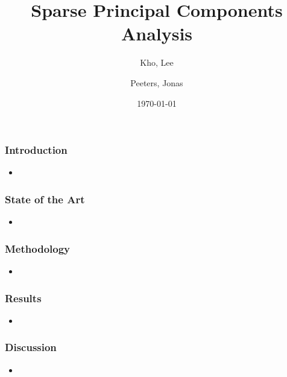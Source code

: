 \documentclass[11pt]{beamer}
\author{
	Kho, Lee
	\and
	Peeters, Jonas
}
\title{Sparse Principal Components Analysis}
\institute{\texttt{[image: ../Figures/nyu\_long\_black.png]}}
\date{\today}
\begin{document}
\begin{frame}
\titlepage
\end{frame}

\begin{frame}\frametitle{Introduction}
\begin{itemize}
\item 
\end{itemize}
\end{frame}

\begin{frame}\frametitle{State of the Art}
\begin{itemize}
\item 
\end{itemize}
\end{frame}

\begin{frame}\frametitle{Methodology}
\begin{itemize}
\item 
\end{itemize}
\end{frame}

\begin{frame}\frametitle{Results}
\begin{itemize}
\item 
\end{itemize}
\end{frame}

\begin{frame}\frametitle{Discussion}
\begin{itemize}
\item 
\end{itemize}
\end{frame}
\end{document}
